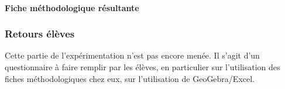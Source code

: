 \paragraph{Fiche méthodologique résultante}

\subsubsection{Retours élèves}

Cette partie de l'expérimentation n'est pas encore menée. Il s'agit d'un questionnaire à faire remplir par les élèves, en particulier sur l'utilisation des fiches méthodologiques chez eux, sur l'utilisation de GeoGebra/Excel.

